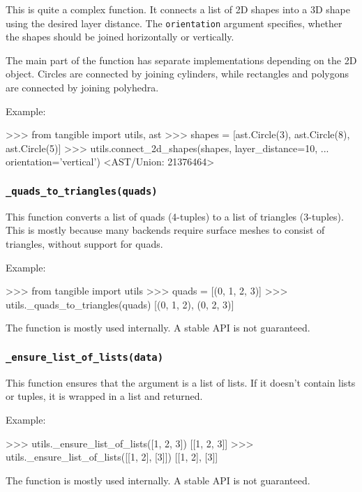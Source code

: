 This is quite a complex function. It connects a list of 2D shapes into a 3D
shape using the desired layer distance. The \texttt{orientation} argument
specifies, whether the shapes should be joined horizontally or vertically.

The main part of the function has separate implementations depending on the 2D
object. Circles are connected by joining cylinders, while rectangles and
polygons are connected by joining polyhedra.

\vspace{.5\baselineskip}

\noindent Example:

\vspace{.5\baselineskip}
\begin{pythoncode}
>>> from tangible import utils, ast
>>> shapes = [ast.Circle(3), ast.Circle(8), ast.Circle(5)]
>>> utils.connect_2d_shapes(shapes, layer_distance=10,
...     orientation='vertical')
<AST/Union: 21376464>
\end{pythoncode}


\subsubsection{\texttt{\_quads\_to\_triangles(quads)}}

This function converts a list of quads (4-tuples) to a list of triangles
(3-tuples). This is mostly because many backends require surface meshes to
consist of triangles, without support for quads.

\vspace{.5\baselineskip}

\noindent Example:

\vspace{.5\baselineskip}
\begin{pythoncode}
>>> from tangible import utils
>>> quads = [(0, 1, 2, 3)]
>>> utils._quads_to_triangles(quads)
[(0, 1, 2), (0, 2, 3)]
\end{pythoncode}

\noindent The function is mostly used internally. A stable API is not guaranteed.


\subsubsection{\texttt{\_ensure\_list\_of\_lists(data)}}

This function ensures that the argument is a list of lists. If it doesn't
contain lists or tuples, it is wrapped in a list and returned.

\vspace{.5\baselineskip}

\noindent Example:

\vspace{.5\baselineskip}
\begin{pythoncode}
>>> utils._ensure_list_of_lists([1, 2, 3])
[[1, 2, 3]]
>>> utils._ensure_list_of_lists([[1, 2], [3]])
[[1, 2], [3]]
\end{pythoncode}

\noindent The function is mostly used internally. A stable API is not guaranteed.
